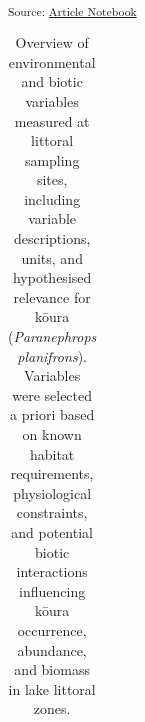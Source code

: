 \documentclass[
  letterpaper,
  DIV=11,
  numbers=noendperiod]{scrartcl}
\begin{document}
\textsubscript{Source:
\href{https://OlivierRaven.github.io/Koura_shoreline_habitats/index.qmd.html}{Article
Notebook}}

{

\begin{longtable}[]{@{}
  >{\raggedright\arraybackslash}p{}
  >{\raggedright\arraybackslash}p{}
  >{\raggedright\arraybackslash}p{}
  >{\raggedright\arraybackslash}p{}@{}}

\caption{\label{tbl-environmental-biotic-overview-ms}Overview of
environmental and biotic variables measured at littoral sampling sites,
including variable descriptions, units, and hypothesised relevance for
kōura (\emph{Paranephrops planifrons}). Variables were selected a priori
based on known habitat requirements, physiological constraints, and
potential biotic interactions influencing kōura occurrence, abundance,
and biomass in lake littoral zones.}

\tabularnewline


\end{longtable}}
\end{document}
